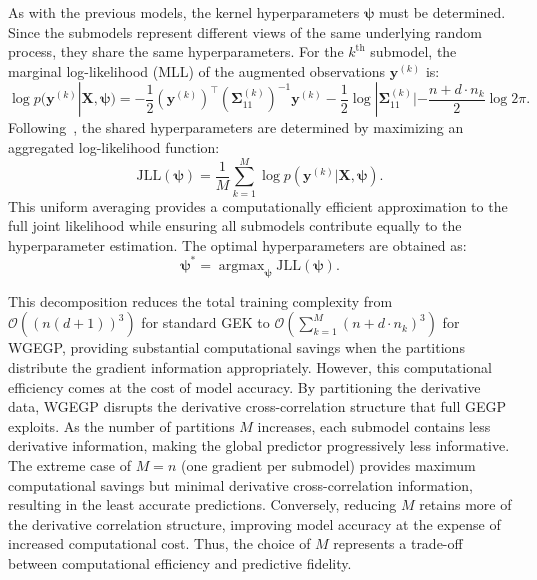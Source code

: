 \documentclass[12pt]{article}
\DeclareMathOperator*{\argmax}{argmax}
\begin{document}
As with the previous models, the kernel hyperparameters $\boldsymbol{\psi}$ must be determined. Since the submodels represent different views of the same underlying random process, they share the same hyperparameters. For the $k^{\text{th}}$ submodel, the marginal log-likelihood (MLL) of the augmented observations $\mathbf{y}^{(k)}$ is:
\begin{equation}
	\label{eqn:wgek_mll}
	\log p(\mathbf{y}^{(k)}|\mathbf{X}, \boldsymbol{\psi}) = -\frac{1}{2} \left(\mathbf{y}^{(k)}\right)^\top \left(\boldsymbol{\Sigma}^{(k)}_{11}\right)^{-1} \mathbf{y}^{(k)} - \frac{1}{2}\log|\boldsymbol{\Sigma}^{(k)}_{11}| - \frac{n + d \cdot n_k}{2}\log 2\pi.
\end{equation}
Following~\cite{HanWeightedGEK}, the shared hyperparameters are determined by maximizing an aggregated log-likelihood function:
\begin{equation}
	\label{eqn:wgek_jll}
	\text{JLL}(\boldsymbol{\psi}) = \frac{1}{M}\sum_{k=1}^{M}\log p(\mathbf{y}^{(k)}|\mathbf{X}, \boldsymbol{\psi}).
\end{equation}
This uniform averaging provides a computationally efficient approximation to the full joint likelihood while ensuring all submodels contribute equally to the hyperparameter estimation. The optimal hyperparameters are obtained as:
\begin{equation}
	\label{eqn:wgek_optimal_psi}
	\boldsymbol{\psi}^* = \argmax_{\boldsymbol{\psi}} \text{JLL}(\boldsymbol{\psi}).
\end{equation}

This decomposition reduces the total training complexity from $\mathcal{O}((n(d+1))^3)$ for standard GEK to $\mathcal{O}\left(\sum_{k=1}^M (n + d \cdot n_k)^3\right)$ for WGEGP, providing substantial computational savings when the partitions distribute the gradient information appropriately. However, this computational efficiency comes at the cost of model accuracy. By partitioning the derivative data, WGEGP disrupts the derivative cross-correlation structure that full GEGP exploits. As the number of partitions $M$ increases, each submodel contains less derivative information, making the global predictor progressively less informative. The extreme case of $M = n$ (one gradient per submodel) provides maximum computational savings but minimal derivative cross-correlation information, resulting in the least accurate predictions. Conversely, reducing $M$ retains more of the derivative correlation structure, improving model accuracy at the expense of increased computational cost. Thus, the choice of $M$ represents a trade-off between computational efficiency and predictive fidelity.
\end{document}
